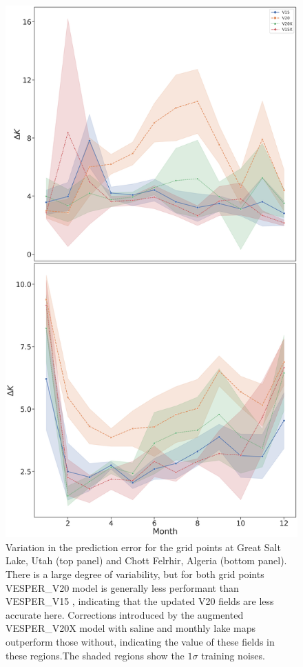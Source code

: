 \documentclass[hess, twostagejnl]{copernicus}
\begin{document}
	\begin{figure}
	\includegraphics[scale=0.2]{timeseries_slc_chott}
	\caption{Variation in the prediction error for the grid points at Great Salt Lake, Utah (top panel) and Chott Felrhir, Algeria (bottom panel). There is a large degree of variability, but for both grid points VESPER\_V20 model is generally less performant than VESPER\_V15 , indicating that the updated V20 fields are less accurate here. Corrections introduced by the augmented VESPER\_V20X model with saline and monthly lake maps outperform those without, indicating the value of these fields in these regions.The shaded regions show the $1 \sigma$ training noises.} 
	\label{fig:timeseries_stacked}
\end{figure}
\end{document}
